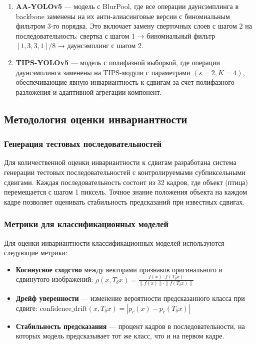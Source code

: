 \begin{enumerate}
    \item \textbf{AA-YOLOv5} — модель с BlurPool, где все операции даунсэмплинга в backbone заменены на их анти-алиасинговые версии с биномиальным фильтром 3-го порядка. Это включает замену сверточных слоев с шагом 2 на последовательность: свертка с шагом 1 → биномиальный фильтр $[1, 3, 3, 1]/8$ → даунсэмплинг с шагом 2.
    
    \item \textbf{TIPS-YOLOv5} — модель с полифазной выборкой, где операции даунсэмплинга заменены на TIPS-модули с параметрами $(s=2, K=4)$, обеспечивающие явную инвариантность к сдвигам за счет полифазного разложения и адаптивной агрегации компонент.
\end{enumerate}

\subsection{Методология оценки инвариантности}
\label{sec:evaluation}

\subsubsection{Генерация тестовых последовательностей}
\label{sec:evaluation:sequences}

Для количественной оценки инвариантности к сдвигам разработана система генерации тестовых последовательностей с контролируемыми субпиксельными сдвигами. Каждая последовательность состоит из 32 кадров, где объект (птица) перемещается с шагом 1 пиксель. Точное знание положения объекта на каждом кадре позволяет оценивать стабильность предсказаний при известных сдвигах.

\subsubsection{Метрики для классификационных моделей}
\label{sec:evaluation:classification}

Для оценки инвариантности классификационных моделей используются следующие метрики:

\begin{itemize}
    \item \textbf{Косинусное сходство} между векторами признаков оригинального и сдвинутого изображений:
    $\rho(x, T_{\delta}x) = \frac{f(x) \cdot f(T_{\delta}x)}{\|f(x)\| \cdot \|f(T_{\delta}x)\|}$
    
    \item \textbf{Дрейф уверенности} — изменение вероятности предсказанного класса при сдвиге:
    $\text{confidence\_drift}(x, T_{\delta}x) = |p_c(x) - p_c(T_{\delta}x)|$
    
    \item \textbf{Стабильность предсказания} — процент кадров в последовательности, на которых модель предсказывает тот же класс, что и на первом кадре.
\end{itemize}

